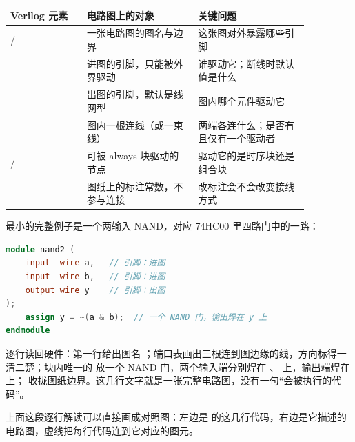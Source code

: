 \begin{longtable}{L{0.22\linewidth}L{0.32\linewidth}L{0.32\linewidth}}
\toprule
Verilog 元素 & 电路图上的对象 & 关键问题 \\
\midrule
{}/ & 一张电路图的图名与边界 & 这张图对外暴露哪些引脚 \\
 & 进图的引脚，只能被外界驱动 & 谁驱动它；断线时默认值是什么 \\
 & 出图的引脚，默认是线网型 & 图内哪个元件驱动它 \\
 & 图内一根连线（或一束线） & 两端各连什么；是否有且仅有一个驱动者 \\
/ & 可被 always 块驱动的节点 & 驱动它的是时序块还是组合块 \\
 & 图纸上的标注常数，不参与连接 & 改标注会不会改变接线方式 \\
\bottomrule
\end{longtable}

最小的完整例子是一个两输入 NAND，对应 74HC00 里四路门中的一路：

\begin{lstlisting}[language=Verilog]
module nand2 (
    input  wire a,   // 引脚：进图
    input  wire b,   // 引脚：进图
    output wire y    // 引脚：出图
);
    assign y = ~(a & b);  // 一个 NAND 门，输出焊在 y 上
endmodule
\end{lstlisting}

逐行读回硬件：第一行给出图名 ；端口表画出三根连到图边缘的线，方向标得一清二楚；块内唯一的  放一个 NAND 门，两个输入端分别焊在 、 上，输出端焊在  上； 收拢图纸边界。这几行文字就是一张完整电路图，没有一句“会被执行的代码”。

上面这段逐行解读可以直接画成对照图：左边是  的这几行代码，右边是它描述的电路图，虚线把每行代码连到它对应的图元。


